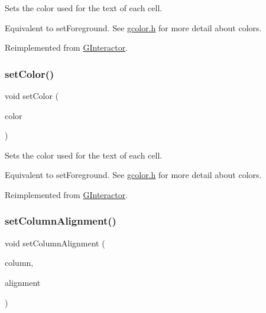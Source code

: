 Sets the color used for the text of each cell. 

Equivalent to set\+Foreground. See \mbox{\hyperlink{gcolor_8h_source}{gcolor.\+h}} for more detail about colors. 

Reimplemented from \mbox{\hyperlink{classGInteractor_ab1f5cc0f5cc6bbbd716a526c61f1081d}{G\+Interactor}}.

\mbox{\label{classGTable_ad148324da1b0340e84e24dffa577ffca}} 
\subsubsection{\texorpdfstring{set\+Color()}{setColor()}\hspace{0.1cm}{\footnotesize\ttfamily [2/2]}}
{\footnotesize\ttfamily void set\+Color (\begin{DoxyParamCaption}\item[{const std\+::string \&}]{color }\end{DoxyParamCaption})\hspace{0.3cm}{\ttfamily [virtual]}}



Sets the color used for the text of each cell. 

Equivalent to set\+Foreground. See \mbox{\hyperlink{gcolor_8h_source}{gcolor.\+h}} for more detail about colors. 

Reimplemented from \mbox{\hyperlink{classGInteractor_a61374df6c11b52cfbb0815decdbaebc6}{G\+Interactor}}.

\mbox{\label{classGTable_a84b3f42bb5d010483b78b9fd7e9c55f0}} 
\subsubsection{\texorpdfstring{set\+Column\+Alignment()}{setColumnAlignment()}}
{\footnotesize\ttfamily void set\+Column\+Alignment (\begin{DoxyParamCaption}\item[{int}]{column,  }\item[{Horizontal\+Alignment}]{alignment }\end{DoxyParamCaption})\hspace{0.3cm}{\ttfamily [virtual]}}



